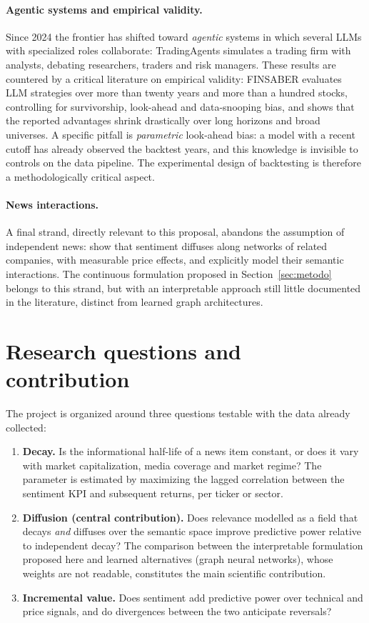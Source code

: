 \documentclass[a4paper,11pt]{article}
\begin{document}
\paragraph{Agentic systems and empirical validity.} Since 2024 the frontier has shifted toward \textit{agentic} systems in which several LLMs with specialized roles collaborate: TradingAgents \parencite{xiao2025tradingagents} simulates a trading firm with analysts, debating researchers, traders and risk managers. These results are countered by a critical literature on empirical validity: FINSABER \parencite{li2025finsaber} evaluates LLM strategies over more than twenty years and more than a hundred stocks, controlling for survivorship, look-ahead and data-snooping bias, and shows that the reported advantages shrink drastically over long horizons and broad universes. A specific pitfall is \emph{parametric} look-ahead bias: a model with a recent cutoff has already observed the backtest years, and this knowledge is invisible to controls on the data pipeline. The experimental design of backtesting is therefore a methodologically critical aspect.

\paragraph{News interactions.} A final strand, directly relevant to this proposal, abandons the assumption of independent news: \textcite{wan2021sentimentdiffusion} show that sentiment diffuses along networks of related companies, with measurable price effects, and \textcite{wang2024finin} explicitly model their semantic interactions. The continuous formulation proposed in Section~\ref{sec:metodo} belongs to this strand, but with an interpretable approach still little documented in the literature, distinct from learned graph architectures.

\section{Research questions and contribution}

The project is organized around three questions testable with the data already collected:
\begin{enumerate}\setlength\itemsep{0.1em}
  \item \textbf{Decay.} Is the informational half-life of a news item constant, or does it vary with market capitalization, media coverage and market regime? The parameter is estimated by maximizing the lagged correlation between the sentiment KPI and subsequent returns, per ticker or sector.
  \item \textbf{Diffusion (central contribution).} Does relevance modelled as a field that decays \emph{and} diffuses over the semantic space improve predictive power relative to independent decay? The comparison between the interpretable formulation proposed here and learned alternatives (graph neural networks), whose weights are not readable, constitutes the main scientific contribution.
  \item \textbf{Incremental value.} Does sentiment add predictive power over technical and price signals, and do divergences between the two anticipate reversals?
\end{enumerate}
\end{document}
